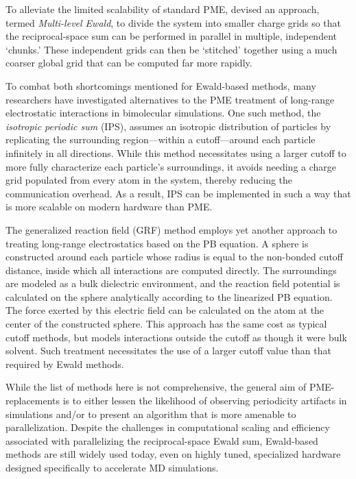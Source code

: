 To alleviate the limited scalability of standard PME,
\citeauthor{Cerutti_JChemTheoryComput_2010_v6_p443} devised an approach, termed
\emph{Multi-level Ewald}, to divide the system into smaller charge grids so that
the reciprocal-space sum can be performed in parallel in multiple, independent
`chunks.' \cite{Cerutti_JChemTheoryComput_2010_v6_p443} These independent grids
can then be `stitched' together using a much coarser global grid that can be
computed far more rapidly.

To combat both shortcomings mentioned for Ewald-based methods, many researchers
have investigated alternatives to the PME treatment of long-range electrostatic
interactions in bimolecular simulations.  One such method, the \emph{isotropic
periodic sum} (IPS), assumes an isotropic distribution of particles by
replicating the surrounding region---within a cutoff---around each particle
infinitely in all directions. \cite{Wu_JChemPhys_2005_v122_p044107} While this
method necessitates using a larger cutoff to more fully characterize each
particle's surroundings, it avoids needing a charge grid populated from every
atom in the system, thereby reducing the communication overhead. As a result,
IPS can be implemented in such a way that is more scalable on modern hardware
than PME.

The generalized reaction field (GRF) method employs yet another approach to
treating long-range electrostatics based on the PB equation. A sphere is
constructed around each particle whose radius is equal to the non-bonded cutoff
distance, inside which all interactions are computed directly. The surroundings
are modeled as a bulk dielectric environment, and the reaction field potential
is calculated on the sphere analytically according to the linearized PB
equation. The force exerted by this electric field can be calculated on the atom
at the center of the constructed sphere. \cite{Tironi_JChemPhys_1995_v102_p5451}
This approach has the same cost as typical cutoff methods, but models
interactions outside the cutoff as though it were bulk solvent. Such treatment
necessitates the use of a larger cutoff value than that required by Ewald
methods.

While the list of methods here is not comprehensive, the general aim of
PME-replacements is to either lessen the likelihood of observing periodicity
artifacts in simulations and/or to present an algorithm that is more amenable to
parallelization. Despite the challenges in computational scaling and efficiency
associated with parallelizing the reciprocal-space Ewald sum, Ewald-based
methods are still widely used today, even on highly tuned, specialized hardware
designed specifically to accelerate MD simulations. \cite{Anton}

